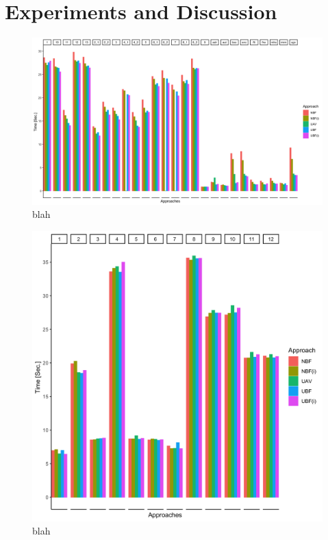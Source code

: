 \section{Experiments and Discussion}
\label{sec:exp}

\begin{figure}
\includegraphics[width = \linewidth] {figs/plots/enron1-5.png}
\caption[blah]{blah}
\label{fig:enron1-5}
\end{figure}

\begin{figure}
\centering
\includegraphics[scale=0.12] {figs/plots/emp1-5.png}
\caption[blah]{blah}
\label{fig:emp1-5}
\end{figure}


